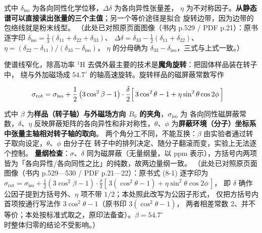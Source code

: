 式中 $\delta_{\mathrm{iso}}$ 为各向同性化学位移，$\Delta\delta$ 为各向异性张量差，
$\eta$ 为不对称因子。\textbf{从静态谱可以直接读出张量的三个主值}；另一个等价途径是拟合
旋转边带，因为边带的包络线就是粉末线型。
（此处已对照原页面图像（书内 p.529 / PDF p.21）：原书逐字印
$\delta_{\mathrm{iso}}=\tfrac{1}{3}(\delta_{11}+\delta_{22}+\delta_{33})$、
$\Delta\delta=\delta_{33}-\tfrac{1}{2}(\delta_{11}+\delta_{22})$、
$\eta=(\delta_{22}-\delta_{11})/(\delta_{33}-\delta_{\mathrm{iso}})$，
$\eta$ 的分母确为 $\delta_{33}-\delta_{\mathrm{iso}}$，三式与上式一致。）

使谱线窄化，除高功率 $^{1}$H 去偶外最主要的技术是\textbf{魔角旋转}：把固体样品装在转子中，
绕与外加磁场成 $54.7^\circ$ 的轴高速旋转。旋转样品的磁屏蔽常数写作

\begin{equation}
\label{eq:sigma1}
\begin{aligned}
\sigma_{\mathrm{rot}}&=\sigma_{\mathrm{iso}}
+\frac{1}{2}\left(3\cos^{2}\beta-1\right)\cdot\frac{\delta}{2}
\Bigl[\,3\cos^{2}\theta-1+\eta\sin^{2}\theta\cos 2\phi\,\Bigr]
\end{aligned}
\end{equation}

式中 $\beta$ 为\textbf{样品（转子轴）与外磁场方向 $B_0$ 的夹角}，$\sigma_{\mathrm{iso}}$ 为
各向同性磁屏蔽常数，$\delta$、$\eta$ 反映屏蔽矩阵的各向异性和非对称性，$\theta$、$\phi$
为\textbf{屏蔽环境（分子）坐标系中张量主轴相对转子轴的取向}。
两个角分工不同，不能互换：$\beta$ 由实验者通过转子取向设定，$\theta$、$\phi$ 由分子在
转子中的排列决定、随分子翻滚而变，实验上无法逐个控制。
\textbf{量纲检查}：$\sigma$、$\delta$ 同为磁屏蔽（无量纲量，以 ppm 表示），方括号内两项
皆为「各向异性/各向同性之比」的纯数，故两边量纲一致。
（此处已对照原页面图像（书内 p.529—530 / PDF p.21—22）：原书式 (8-1) 逐字印为
$\sigma_{\mathrm{rot}}=\sigma_{\mathrm{iso}}+\tfrac{1}{2}(3\cos^{2}\beta-1)\cdot
\tfrac{\delta}{2}[\,3(\cos^{2}\theta-1)+\eta\sin^{2}\theta\cos 2\phi\,]$，
即 $\delta$ 确作公因子提到方括号外、$\eta$ 项不带 $1/2$；本处照此改写为公因子形式，
仅把方括号内首项按通行写法作 $3\cos^{2}\theta-1$（原书印 $3(\cos^{2}\theta-1)$，
两者相差常数 2、并不等价；本处按标准式取之，原印法备查）。$\beta=54.7^\circ$ 时整体归零的结论不受影响。）

